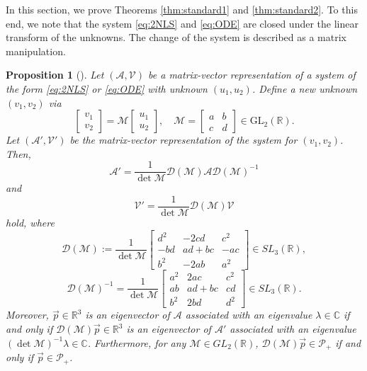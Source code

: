 \documentclass[11pt,a4paper,twosides]{amsart}
\theoremstyle{plain}
\newtheorem{proposition}[theorem]{Proposition}
\theoremstyle{remark}
\numberwithin{equation}{section}
\newcommand{\C}{\mathbb{C}}
\newcommand{\R}{\mathbb{R}}
\DeclareMathOperator{\sign}{sign}
\DeclareMathOperator{\rank}{rank}
\theoremstyle{definition}
\newcommand{\1}{{\bf 1}_{\{|x| < |t|\}}}
\begin{document}
In this section, we prove Theorems \ref{thm:standard1} 
and \ref{thm:standard2}. To this end, we note that 
the system \eqref{eq:2NLS} and \eqref{eq:ODE} are closed under the linear transform of the unknowns.
The change of the system is described
as a matrix manipulation.
\begin{proposition}[\cite{MaSeUr2}]\label{P:change}
Let $(\mathscr{A},\mathscr{V})$ be a matrix-vector representation of a system of the form \eqref{eq:2NLS} or \eqref{eq:ODE}
with unknown $(u_1,u_2)$.
Define a new unknown $(v_1,v_2)$ via
\[
	\begin{bmatrix} v_1 \\ v_2 \end{bmatrix} = \mathscr{M} \begin{bmatrix} u_1 \\ u_2 \end{bmatrix},\quad
	\mathscr{M} = \begin{bmatrix} a & b \\ c & d \end{bmatrix} \in \text{GL}_2(\R).
\]
Let $(\mathscr{A}',\mathscr{V}')$ be the matrix-vector representation of the system for $(v_1,v_2)$. Then,
\begin{equation}\label{E:Aprime}
	\mathscr{A}' = \frac{1}{\det \mathscr{M}}  \mathscr{D}(\mathscr{M}) \mathscr{A} \mathscr{D}(\mathscr{M})^{-1}
\end{equation}
and
\begin{equation}\label{E:Vprime}
	\mathscr{V}'
	= \frac1{\det \mathscr{M}}  \mathscr{D}(\mathscr{M}) \mathscr{V}
\end{equation}
hold, where
\[
	\mathscr{D}(\mathscr{M}) := \frac1{\det \mathscr{M}}
	\begin{bmatrix} d^2 & -2cd & c^2 \\ -bd & ad+ bc & -ac \\ b^2 & -2ab & a^2 \end{bmatrix}
	\in {SL}_3 (\R),
\]
\begin{equation*}%
	\mathscr{D}(\mathscr{M})^{-1} =\frac1{\det \mathscr{M}}\begin{bmatrix} a^2 & 2ac & c^2 \\ ab & ad+ bc & cd \\ b^2 & 2bd & d^2 \end{bmatrix} \in SL_3(\R).
\end{equation*}
Moreover, 
$\vec{p}\in \R^3$ is an eigenvector of $\mathscr{A}$ associated with an eigenvalue $\lambda \in \C$ if and only if
$\mathscr{D}(\mathscr{M})\vec{p}\in \R^3$ is an eigenvector of $\mathscr{A}'$ associated with an eigenvalue $(\det \mathscr{M})^{-1}\lambda \in \C$.
Furthermore, for any $\mathscr{M}\in GL_2(\R)$, $\mathscr{D}(\mathscr{M})\vec{p}\in \mathcal{P}_+$ if and only if $\vec{p}\in \mathcal{P}_+$.
\end{proposition}
\end{document}
